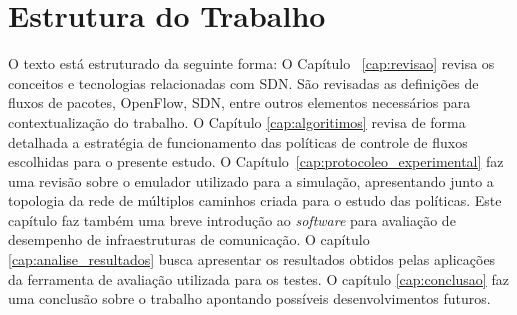     

\section{Estrutura do Trabalho}
\label{sec:estrutura}
O texto está estruturado da seguinte forma: O Capítulo ~\ref{cap:revisao} revisa os conceitos e tecnologias relacionadas com SDN. São revisadas as definições de fluxos de pacotes, OpenFlow, SDN, entre outros elementos necessários para contextualização do trabalho. 
O Capítulo \ref{cap:algoritimos} revisa de forma detalhada a estratégia de funcionamento das políticas de controle de fluxos escolhidas para o presente estudo.
O Capítulo~\ref{cap:protocoleo_experimental} faz uma revisão sobre o emulador utilizado para a simulação, apresentando junto a topologia da rede de múltiplos caminhos criada para o estudo das políticas. Este capítulo faz também uma breve introdução ao \textit{software} para avaliação de desempenho de infraestruturas de comunicação.
O capítulo \ref{cap:analise_resultados} busca apresentar os resultados obtidos pelas aplicações da ferramenta de avaliação utilizada para os testes.
O capítulo \ref{cap:conclusao} faz uma conclusão sobre o trabalho apontando possíveis desenvolvimentos futuros.

